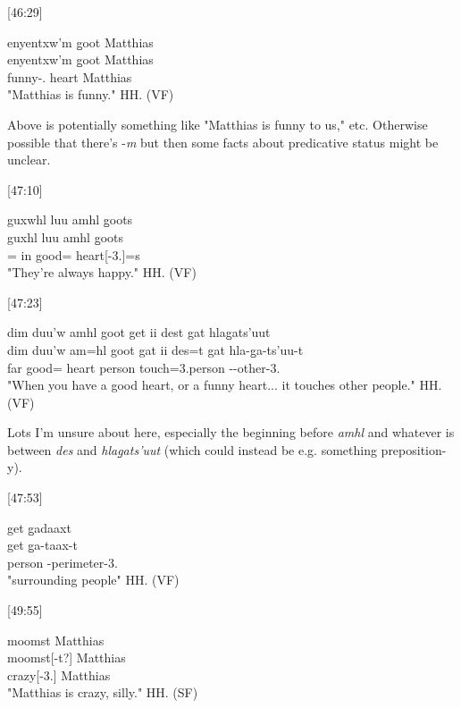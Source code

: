 [46:29]
\begin{exe}
    \ex \glll
    enyentxw'm g̱oot Matthias \\
    enyentxw'm g̱oot Matthias \\
    funny-\Fpl.\Ii{} heart Matthias \\
    \glt "Matthias is funny." \hfill HH.\ElicitationDate{} (VF)
\end{exe}

Above is potentially something like "Matthias is funny to us," etc. Otherwise possible that there's -\textit{m} \Attr{} but then some facts about predicative status might be unclear. 

[47:10]
\begin{exe}
    \ex \glll
    guxwhl luu amhl g̱oots \\
    guxhl luu amhl g̱oots \\
    \Hab=\Cn{} in good=\Cn{} heart[-3.\Ii]=s \\
    \glt "They're always happy." \hfill HH.\ElicitationDate{} (VF)
\end{exe}

[47:23]
\begin{exe}
    \ex \glll
    dim duu’w amhl goot get ii dest gat hlag̱ats’uut \\
    dim duu'w am=hl goot gat ii des=t gat hla-g̱a-ts’uu-t \\
    \Prosp{} far good=\Cn{} heart person \Ccnj{} touch=3.\I person \Part-\Distr-other-3.\Ii \\
    \glt "When you have a good heart, or a funny heart... it touches other people." \hfill HH.\ElicitationDate{} (VF)
\end{exe}

Lots I'm unsure about here, especially the beginning before \textit{amhl} and whatever is between \textit{des} and \textit{hlag̱ats’uut} (which could instead be e.g. something preposition-y).

[47:53]
\begin{exe}
    \ex \glll
    get g̱adaaxt \\
    get g̱a-taax-t \\
    person \Distr-perimeter-3.\Ii \\
    \glt "surrounding people" \hfill HH.\ElicitationDate{} (VF)
\end{exe}

[49:55]
\begin{exe}
    \ex \glll
    moomst Matthias \\
    moomst[-t?] Matthias \\
    crazy[-3.\Ii] Matthias \\
    \glt "Matthias is crazy, silly." \hfill HH.\ElicitationDate{} (SF)
\end{exe}

